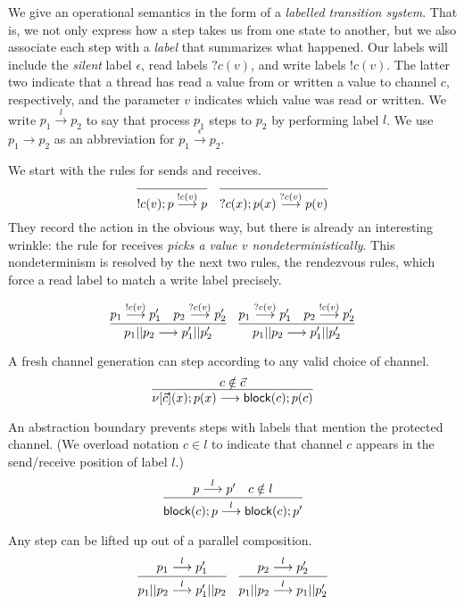 \documentclass{amsbook}
\theoremstyle{definition}
\theoremstyle{remark}
\numberwithin{section}{chapter}
\numberwithin{equation}{chapter}
\begin{document}
\newcommand{\silent}[0]{\epsilon}
\newcommand{\readl}[2]{?#1(#2)}
\newcommand{\writel}[2]{!#1(#2)}
\newcommand{\lts}[3]{#1 \stackrel{#2}{\longrightarrow} #3}
\newcommand{\ltsS}[3]{#1 \stackrel{#2}{\longrightarrow}^* #3}

\medskip

We give an operational semantics in the form of a \emph{labelled transition system}.
That is, we not only express how a step takes us from one state to another, but we also associate each step with a \emph{label} that summarizes what happened.
Our labels will include the \emph{silent} label $\silent$, read labels $\readl{c}{v}$, and write labels $\writel{c}{v}$.
The latter two indicate that a thread has read a value from or written a value to channel $c$, respectively, and the parameter $v$ indicates which value was read or written.
We write $\lts{p_1}{l}{p_2}$ to say that process $p_1$ steps to $p_2$ by performing label $l$.
We use $\lts{p_1}{}{p_2}$ as an abbreviation for $\lts{p_1}{\silent}{p_2}$.

We start with the rules for sends and receives.
$$\infer{\lts{\send{c}{v}{p}}{\writel{c}{v}}{p}}{}
\quad \infer{\lts{\recv{c}{x}{p(x)}}{\readl{c}{v}}{p(v)}}{}$$
They record the action in the obvious way, but there is already an interesting wrinkle: the rule for receives \emph{picks a value $v$ nondeterministically}.
This nondeterminism is resolved by the next two rules, the rendezvous rules, which force a read label to match a write label precisely.

$$\infer{\lts{\parl{p_1}{p_2}}{}{\parl{p'_1}{p'_2}}}{
  \lts{p_1}{\writel{c}{v}}{p'_1}
  & \lts{p_2}{\readl{c}{v}}{p'_2}
}
\quad \infer{\lts{\parl{p_1}{p_2}}{}{\parl{p'_1}{p'_2}}}{
  \lts{p_1}{\readl{c}{v}}{p'_1}
  & \lts{p_2}{\writel{c}{v}}{p'_2}
}$$

A fresh channel generation can step according to any valid choice of channel.
$$\infer{\lts{\newp{\vec c}{x}{p(x)}}{}{\block{c}{p(c)}}}{
  c \notin \vec c
}$$

An abstraction boundary prevents steps with labels that mention the protected channel.
(We overload notation $c \in l$ to indicate that channel $c$ appears in the send/receive position of label $l$.)
$$\infer{\lts{\block{c}{p}}{l}{\block{c}{p'}}}{
  \lts{p}{l}{p'}
  & c \notin l
}$$

Any step can be lifted up out of a parallel composition.
$$\infer{\lts{\parl{p_1}{p_2}}{l}{\parl{p'_1}{p_2}}}{
  \lts{p_1}{l}{p'_1}
}
\quad \infer{\lts{\parl{p_1}{p_2}}{l}{\parl{p_1}{p'_2}}}{
  \lts{p_2}{l}{p'_2}
}$$
\end{document}
